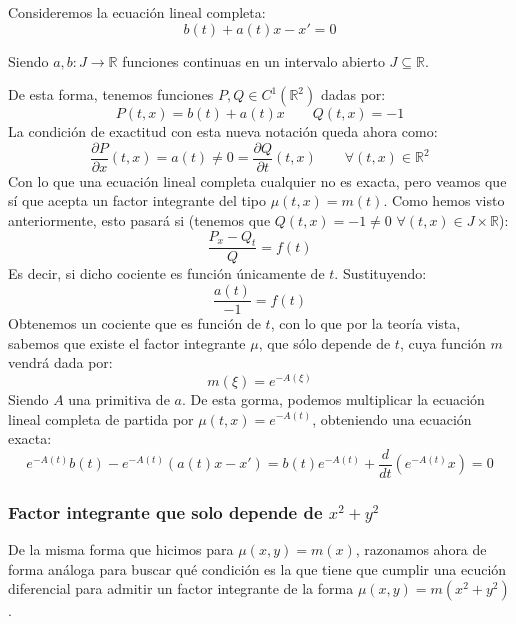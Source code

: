 \begin{ejemplo}
    Consideremos la ecuación lineal completa:
    \begin{equation*}
        b(t) + a(t)x - x' = 0
    \end{equation*}

    Siendo $a,b:J\rightarrow\mathbb{R}$ funciones continuas en un intervalo abierto $J\subseteq \mathbb{R}$.

    De esta forma, tenemos funciones $P,Q\in C^1(\mathbb{R}^2)$ dadas por:
    \begin{equation*}
        P(t,x) = b(t) + a(t)x \qquad Q(t,x) = -1
    \end{equation*}
    La condición de exactitud con esta nueva notación queda ahora como:
    \begin{equation*}
        \dfrac{\partial P}{\partial x}(t,x) = a(t) \neq 0 = \dfrac{\partial Q}{\partial t}(t,x) \qquad \forall (t,x)\in \mathbb{R}^2
    \end{equation*}
    Con lo que una ecuación lineal completa cualquier no es exacta, pero veamos que sí que acepta un factor integrante del tipo $\mu(t,x)=m(t)$. Como hemos visto anteriormente, esto pasará si (tenemos que $Q(t,x)=-1\neq 0$ $\forall (t,x)\in J\times \mathbb{R}$):
    \begin{equation*}
        \dfrac{P_x-Q_t}{Q} = f(t)
    \end{equation*}
    Es decir, si dicho cociente es función únicamente de $t$. Sustituyendo:
    \begin{equation*}
        \dfrac{a(t)}{-1} = f(t)
    \end{equation*}
    Obtenemos un cociente que es función de $t$, con lo que por la teoría vista, sabemos que existe el factor integrante $\mu$, que sólo depende de $t$, cuya función $m$ vendrá dada por:
    \begin{equation*}
        m(\xi) = e^{-A(\xi)}
    \end{equation*}
    Siendo $A$ una primitiva de $a$. De esta gorma, podemos multiplicar la ecuación lineal completa de partida por $\mu(t,x) = e^{-A(t)}$, obteniendo una ecuación exacta:
    \begin{equation*}
        e^{-A(t)}b(t) - e^{-A(t)}(a(t)x - x') = b(t)e^{-A(t)} + \dfrac{d}{dt}\left(e^{-A(t)}x\right) = 0
    \end{equation*}
\end{ejemplo}

\subsubsection{Factor integrante que solo depende de $x^2+y^2$}
De la misma forma que hicimos para $\mu(x,y)=m(x)$, razonamos ahora de forma análoga para buscar qué condición es la que tiene que cumplir una ecución diferencial para admitir un factor integrante de la forma $\mu(x,y)=m(x^2+y^2)$.

